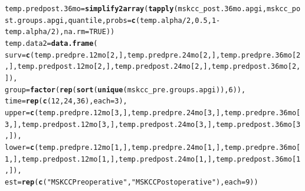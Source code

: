 \documentclass{article}\usepackage[]{graphicx}\usepackage[]{color}
\makeatletter
\newcommand{\hlnum}[1]{\textcolor[rgb]{0.686,0.059,0.569}{#1}}%
\newcommand{\hlstr}[1]{\textcolor[rgb]{0.192,0.494,0.8}{#1}}%
\newcommand{\hlopt}[1]{\textcolor[rgb]{0,0,0}{#1}}%
\newcommand{\hlstd}[1]{\textcolor[rgb]{0.345,0.345,0.345}{#1}}%
\newcommand{\hlkwb}[1]{\textcolor[rgb]{0.69,0.353,0.396}{#1}}%
\newcommand{\hlkwc}[1]{\textcolor[rgb]{0.333,0.667,0.333}{#1}}%
\newcommand{\hlkwd}[1]{\textcolor[rgb]{0.737,0.353,0.396}{\textbf{#1}}}%
\newenvironment{kframe}{%
 \def\at@end@of@kframe{}%
 \ifinner\ifhmode%
  \def\at@end@of@kframe{\end{minipage}}%
  \begin{minipage}{\columnwidth}%
 \fi\fi%
 \def\FrameCommand##1{\hskip\@totalleftmargin \hskip-\fboxsep
 \colorbox{shadecolor}{##1}\hskip-\fboxsep
     \hskip-\linewidth \hskip-\@totalleftmargin \hskip\columnwidth}%
 \MakeFramed {\advance\hsize-\width
   \@totalleftmargin\z@ \linewidth\hsize
   \@setminipage}}%
 {\par\unskip\endMakeFramed%
 \at@end@of@kframe}
\newenvironment{knitrout}{}{} %
\makeatother
\begin{document}
\begin{knitrout}
\begin{kframe}
\begin{alltt}
\hlstd{temp.predpost.36mo} \hlkwb{=} \hlkwd{simplify2array}\hlstd{(}\hlkwd{tapply}\hlstd{(mskcc_post.36mo.apgi, mskcc_post.groups.apgi, quantile,} \hlkwc{probs} \hlstd{=} \hlkwd{c}\hlstd{(temp.alpha}\hlopt{/}\hlnum{2}\hlstd{,} \hlnum{0.5}\hlstd{,} \hlnum{1}\hlopt{-}\hlstd{temp.alpha}\hlopt{/}\hlnum{2}\hlstd{),} \hlkwc{na.rm} \hlstd{=} \hlnum{TRUE}\hlstd{))}
\hlstd{temp.data2} \hlkwb{=} \hlkwd{data.frame}\hlstd{(}
        \hlkwc{surv} \hlstd{=} \hlkwd{c}\hlstd{(temp.predpre.12mo[}\hlnum{2}\hlstd{,], temp.predpre.24mo[}\hlnum{2}\hlstd{,], temp.predpre.36mo[}\hlnum{2}\hlstd{,], temp.predpost.12mo[}\hlnum{2}\hlstd{,], temp.predpost.24mo[}\hlnum{2}\hlstd{,], temp.predpost.36mo[}\hlnum{2}\hlstd{,]),}
        \hlkwc{group} \hlstd{=} \hlkwd{factor}\hlstd{(}\hlkwd{rep}\hlstd{(}\hlkwd{sort}\hlstd{(}\hlkwd{unique}\hlstd{(mskcc_pre.groups.apgi)),} \hlnum{6}\hlstd{)),}
        \hlkwc{time} \hlstd{=} \hlkwd{rep}\hlstd{(}\hlkwd{c}\hlstd{(}\hlnum{12}\hlstd{,} \hlnum{24}\hlstd{,} \hlnum{36}\hlstd{),} \hlkwc{each} \hlstd{=} \hlnum{3}\hlstd{),}
        \hlkwc{upper} \hlstd{=} \hlkwd{c}\hlstd{(temp.predpre.12mo[}\hlnum{3}\hlstd{,], temp.predpre.24mo[}\hlnum{3}\hlstd{,], temp.predpre.36mo[}\hlnum{3}\hlstd{,], temp.predpost.12mo[}\hlnum{3}\hlstd{,], temp.predpost.24mo[}\hlnum{3}\hlstd{,], temp.predpost.36mo[}\hlnum{3}\hlstd{,]),}
        \hlkwc{lower} \hlstd{=} \hlkwd{c}\hlstd{(temp.predpre.12mo[}\hlnum{1}\hlstd{,], temp.predpre.24mo[}\hlnum{1}\hlstd{,], temp.predpre.36mo[}\hlnum{1}\hlstd{,], temp.predpost.12mo[}\hlnum{1}\hlstd{,], temp.predpost.24mo[}\hlnum{1}\hlstd{,], temp.predpost.36mo[}\hlnum{1}\hlstd{,]),}
        \hlkwc{est} \hlstd{=} \hlkwd{rep}\hlstd{(}\hlkwd{c}\hlstd{(}\hlstr{"MSKCC Preoperative"}\hlstd{,} \hlstr{"MSKCC Postoperative"}\hlstd{),} \hlkwc{each} \hlstd{=} \hlnum{9}\hlstd{))}


\end{alltt}
\end{kframe}
\end{knitrout}
\end{document}
